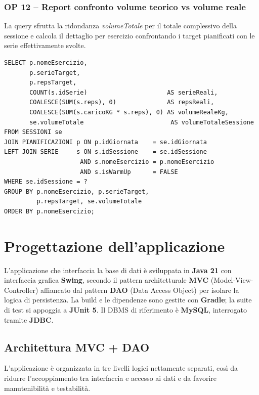 \documentclass[12pt]{report}
\begin{document}
\subsection*{OP 12 – Report confronto volume teorico vs volume reale}

La query sfrutta la ridondanza \textit{volumeTotale} per il totale
complessivo della sessione e calcola il dettaglio per esercizio
confrontando i target pianificati con le serie effettivamente svolte.

\begin{lstlisting}[style=sql]
SELECT p.nomeEsercizio,
       p.serieTarget,
       p.repsTarget,
       COUNT(s.idSerie)                      AS serieReali,
       COALESCE(SUM(s.reps), 0)              AS repsReali,
       COALESCE(SUM(s.caricoKG * s.reps), 0) AS volumeRealeKg,
       se.volumeTotale                        AS volumeTotaleSessione
FROM SESSIONI se
JOIN PIANIFICAZIONI p ON p.idGiornata    = se.idGiornata
LEFT JOIN SERIE     s ON s.idSessione    = se.idSessione
                     AND s.nomeEsercizio = p.nomeEsercizio
                     AND s.isWarmUp      = FALSE
WHERE se.idSessione = ?
GROUP BY p.nomeEsercizio, p.serieTarget,
         p.repsTarget, se.volumeTotale
ORDER BY p.nomeEsercizio;
\end{lstlisting}

\chapter{Progettazione dell'applicazione}

L'applicazione che interfaccia la base di dati è sviluppata in \textbf{Java 21}
con interfaccia grafica \textbf{Swing}, secondo il pattern architetturale
\textbf{MVC} (Model-View-Controller) affiancato dal pattern \textbf{DAO}
(Data Access Object) per isolare la logica di persistenza. La build e le
dipendenze sono gestite con \textbf{Gradle}; la suite di test si appoggia a
\textbf{JUnit 5}. Il DBMS di riferimento è \textbf{MySQL}, interrogato tramite
\textbf{JDBC}.

\section{Architettura MVC + DAO}
L'applicazione è organizzata in tre livelli logici nettamente separati, così
da ridurre l'accoppiamento tra interfaccia e accesso ai dati e da favorire
manutenibilità e testabilità.
\end{document}
